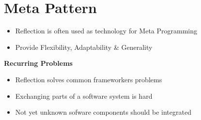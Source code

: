 \section{Meta Pattern}
\begin{itemize}
    \item Reflection is often used as technology for Meta Programming
    \item Provide Flexibility, Adaptability \& Generality
\end{itemize}
\textbf{Recurring Problems}
\begin{itemize}
    \item Reflection solves common frameworkers problems
    \item Exchanging parts of a software system is hard
    \item Not yet unknown sofware components should be integrated
\end{itemize}

